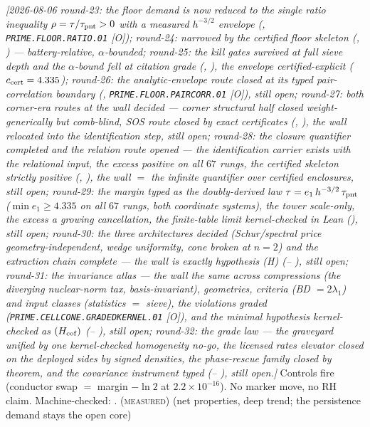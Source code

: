 \emph{[2026-08-06 round-23: the floor demand is now reduced to the
single ratio inequality $\rho=\tau/\tau_{\rm pnt}>0$ with a
measured $h^{-3/2}$ envelope
(,
\texttt{PRIME.FLOOR.RATIO.01} [O]); round-24: narrowed by the
certified floor skeleton (,
) --- battery-relative,
$\alpha$-bounded; round-25: the kill gates survived at full sieve
depth and the $\alpha$-bound fell at citation grade
(,
), the envelope
certified-explicit ($c_{\rm cert} = 4.335$); round-26: the
analytic-envelope route closed at its typed pair-correlation
boundary (,
\texttt{PRIME.FLOOR.PAIRCORR.01} [O]), still open; round-27: both
corner-era routes at the wall decided --- corner structural half
closed weight-generically but comb-blind, SOS route closed by
exact certificates (,
), the wall relocated into
the identification step, still open; round-28: the closure
quantifier completed and the relation route opened --- the
identification carrier exists with the relational input, the
excess positive on all $67$ rungs, the certified skeleton
strictly positive
(,
), the wall $=$ the
infinite quantifier over certified enclosures, still open;
round-29: the margin typed as the doubly-derived law
$\tau = e_1\, h^{-3/2}\, \tau_{\rm pnt}$ ($\min e_1 \ge 4.335$ on
all $67$ rungs, both coordinate systems), the tower scale-only,
the excess a growing cancellation, the finite-table limit
kernel-checked in Lean
(), still open;
round-30: the three architectures decided (Schur/spectral price
geometry-independent, wedge uniformity, cone broken at $n = 2$)
and the extraction chain complete --- the wall is exactly
hypothesis (H)
(--%
), still open;
round-31: the invariance atlas --- the wall the same across
compressions (the diverging nuclear-norm tax, basis-invariant),
geometries, criteria (BD $= 2\lambda_1$) and input classes
(statistics $=$ sieve), the violations graded
(\texttt{PRIME.CELLCONE.GRADEDKERNEL.01} [O]), and the minimal
hypothesis kernel-checked as $(H_{\rm cof})$
(--%
), still open;
round-32: the grade law --- the graveyard unified by one
kernel-checked homogeneity no-go, the licensed rates elevator
closed on the deployed sides by signed densities, the
phase-rescue family closed by theorem, and the covariance
instrument typed
(--%
), still open.]}
Controls fire (conductor swap $=$ margin $-\ln2$ at
$2.2\times10^{-16}$).  No marker move, no RH claim.
Machine-checked: .
(\textsc{measured}) (net properties, deep trend; the persistence
demand stays the open core)
\par\smallskip


